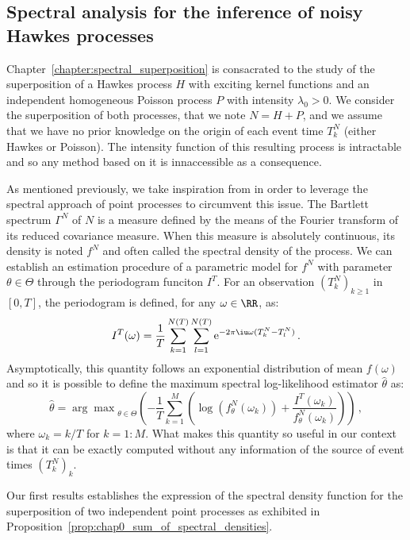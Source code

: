     \subsection{Spectral analysis for the inference of noisy Hawkes processes}
    Chapter~\ref{chapter:spectral_superposition} is consacrated to the study of the superposition of a Hawkes process $H$ with exciting kernel functions and an independent homogeneous Poisson process $P$ with intensity $\lambda_0 > 0$.
    We consider the superposition of both processes, that we note $N = H + P$,
    and we assume that we have no prior knowledge on the origin of each event time $T_k^N$ (either Hawkes or Poisson).
    The intensity function of this resulting process is intractable and so any method based on it is innaccessible as a consequence. 
    
    As mentioned previously, we take inspiration from \textcite{Cheysson2022} in order to leverage the spectral approach of point processes to circumvent this issue. 
    The Bartlett spectrum $\Gamma^N$ of $N$ is a measure defined by the means of the Fourier transform of its reduced covariance measure.
    When this measure is absolutely continuous, its density is noted $f^N$ and often called the spectral density of the process.
    We can establish an estimation procedure of a parametric model for $f^N$ with parameter $\theta\in\Theta$ through the periodogram funciton $I^T$.
    For an observation $(T_k^N)_{k\geq 1}$ in $[0,T]$, the periodogram is defined, for any $\omega\in\RR$, as:
    \begin{equation}\label{eq:chap0_periodogram}
      I^T(\omega) = \frac{1}{T}\sum_{k=1}^{N(T)}\sum_{l=1}^{N(T)}{\mathrm{e}^{-2\pi \iu \omega (T_k^N - T_l^N)}}\,.
    \end{equation}
    Asymptotically, this quantity follows an exponential distribution of mean $f(\omega)$ and so it is possible to define the maximum spectral log-likelihood estimator $\hat \theta$ as:
    \begin{equation}\label{eq:chap0_spectral_estimator}
      \hat \theta = {\arg\max}_{\theta\in\Theta} \left(-\frac{1}{T}\sum_{k=1}^{M}{\left(\log\left(f_\theta^N(\omega_k)\right) + \frac{I^T(\omega_k)}{f_\theta^N(\omega_k)}\right)}\right)\,,
    \end{equation}
    where $\omega_k = k/T$ for $k=1:M$.
    What makes this quantity so useful in our context is that it can be exactly computed without any information of the source of event times $(T_k^N)_k$. 

    Our first results establishes the expression of the spectral density function for the superposition of two independent point processes as exhibited in Proposition~\ref{prop:chap0_sum_of_spectral_densities}.

